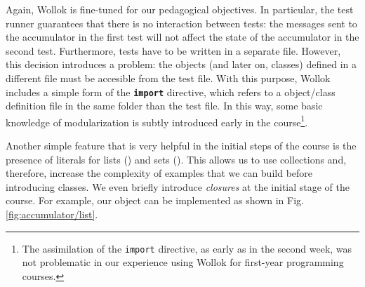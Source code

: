 Again, Wollok is fine-tuned for our pedagogical objectives.
In particular, the test runner guarantees that there is no interaction between tests: the messages sent to the accumulator in the first test will not affect the state of the accumulator in the second test.
Furthermore, tests have to be written in a separate file.
However, this decision introduces a problem: the objects (and later on, classes) defined in a different file must be accesible from the test file. With this purpose, Wollok includes a simple form of the \texttt{\textbf{import}} directive, which refers to a object/class definition file in the same folder than the test file. In this way, some basic knowledge of modularization is subtly introduced early in the course\footnote{The assimilation of the \texttt{import} directive, as early as in the second week, was not problematic in our experience using Wollok for first-year programming courses.}.


\medskip
Another simple feature that is very helpful in the initial steps of the course is the presence of literals for lists (\eg \code{[1,2,3]}) and sets (\eg {}).
This allows us to use collections and, therefore, increase the complexity of examples that we can build before introducing classes.
We even briefly introduce \emph{closures} at the initial stage of the course.
For example, our  object can be implemented as shown in Fig. \ref{fig:accumulator/list}.

